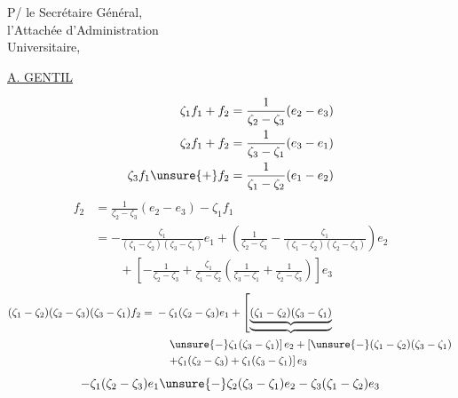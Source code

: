 P/ le Secrétaire Général,\\
l'Attachée d'Administration\\
Universitaire,

\uline{}

\uline{A. GENTIL}

\[
\begin{aligned}
\zeta_1f_1+f_2&=\frac1{\zeta_2-\zeta_3}(e_2-e_3)\\
\zeta_2f_1+f_2&=\frac1{\zeta_3-\zeta_1}(e_3-e_1)\\
\zeta_3f_1\unsure{+}f_2&=\frac1{\zeta_1-\zeta_2}(e_1-e_2)
\end{aligned}
\]
\[
\begin{aligned}
f_2&=\frac1{\zeta_2-\zeta_3}(e_2-e_3)-\zeta_1f_1\\
&=-\frac{\zeta_1}{(\zeta_1-\zeta_2)(\zeta_3-\zeta_1)}e_1+
\left(\frac1{\zeta_2-\zeta_3}-\frac{\zeta_1}{(\zeta_1-\zeta_2)(\zeta_2-\zeta_3)}\right)e_2\\
&\qquad+\left[-\frac1{\zeta_2-\zeta_3}
+\frac{\zeta_1}{\zeta_1-\zeta_2}
\left(\frac1{\zeta_3-\zeta_1}+\frac1{\zeta_2-\zeta_3}\right)\right]e_3
\end{aligned}
\]
\[
\begin{aligned}
(\zeta_1-\zeta_2)(\zeta_2-\zeta_3)(\zeta_3-\zeta_1)f_2
={}&-\zeta_1(\zeta_2-\zeta_3)e_1+
\left[\underbrace{\underbrace{(\zeta_1-\zeta_2)(\zeta_3-\zeta_1)}}\right.\\
&\left.\quad\unsure{-}\zeta_1(\zeta_3-\zeta_1)\right]e_2+
\left[\unsure{-}(\zeta_1-\zeta_2)(\zeta_3-\zeta_1)\right.\\
&\left.\quad+\zeta_1(\zeta_2-\zeta_3)+\zeta_1(\zeta_3-\zeta_1)\right]e_3
\end{aligned}
\]
\[
-\zeta_1(\zeta_2-\zeta_3)e_1
\unsure{-}\zeta_2(\zeta_3-\zeta_1)e_2
-\zeta_3(\zeta_1-\zeta_2)e_3
\]

